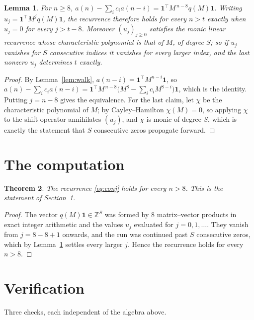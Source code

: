 \documentclass[11pt,a4paper]{article}
\theoremstyle{plain}
\newtheorem{theorem}{Theorem}
\newtheorem{lemma}[theorem]{Lemma}
\theoremstyle{definition}
\begin{document}
\begin{lemma}\label{lem:crit}
For $n\ge8$,
$a(n)-\sum_i c_i a(n-i)=\mathbf{1}^{\!\top}M^{\,n-8}q(M)\mathbf{1}$. Writing
$u_j=\mathbf{1}^{\!\top}M^{j}q(M)\mathbf{1}$, the recurrence therefore holds for every
$n>t$ exactly when $u_j=0$ for every $j>t-8$. Moreover $(u_j)_{j\ge0}$ satisfies the
monic linear recurrence whose characteristic polynomial is that of $M$, of degree $S$; so
if $u_j$ vanishes for $S$ consecutive indices it vanishes for every larger index, and the
last nonzero $u_j$ determines $t$ exactly.
\end{lemma}

\begin{proof}
By Lemma~\ref{lem:walk}, $a(n-i)=\mathbf{1}^{\!\top}M^{n-i}\mathbf{1}$, so
$a(n)-\sum_i c_i a(n-i)
=\mathbf{1}^{\!\top}M^{\,n-8}\bigl(M^{8}-\sum_i c_i M^{8-i}\bigr)
\mathbf{1}$, which is the identity. Putting $j=n-8$ gives the equivalence. For the
last claim, let $\chi$ be the characteristic polynomial of $M$; by Cayley--Hamilton
$\chi(M)=0$, so applying $\chi$ to the shift operator annihilates $(u_j)$, and $\chi$ is
monic of degree $S$, which is exactly the statement that $S$ consecutive zeros propagate
forward.
\end{proof}

\section{The computation}

\begin{theorem}
The recurrence \eqref{eq:conj} holds for every $n>8$. This is the statement of
Section~1.
\end{theorem}

\begin{proof}
The vector $q(M)\mathbf{1}\in\mathbb{Z}^{S}$ was formed by $8$ matrix--vector
products in exact integer arithmetic and the values $u_j$ evaluated for
$j=0,1,\dots$. They vanish from $j=8-8+1$ onwards, and the run was continued past
$S$ consecutive zeros, which by Lemma~\ref{lem:crit} settles every larger $j$. Hence the
recurrence holds for every $n>8$.
\end{proof}

\section{Verification}

Three checks, each independent of the algebra above.
\end{document}
